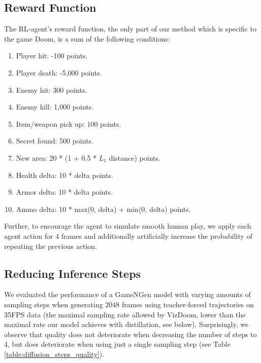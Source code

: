 \documentclass{article} %
\begin{document}
\subsection{Reward Function}
\label{appendix:reward}

The RL-agent's reward function, the only part of our method which is specific to the game Doom, is a sum of the following conditions:

\begin{enumerate}
    \item Player hit: -100 points.
    \item Player death: -5,000 points.
    \item Enemy hit: 300 points.
    \item Enemy kill: 1,000 points.
    \item Item/weapon pick up: 100 points.
    \item Secret found: 500 points.
    \item New area: 20 * (1 + 0.5 * $L_1$ distance) points.
    \item Health delta: 10 * delta points.
    \item Armor delta: 10 * delta points.
    \item Ammo delta: 10 * max(0, delta) + min(0, delta) points.
\end{enumerate}

Further, to encourage the agent to simulate smooth human play, we apply each agent action for 4 frames and additionally artificially increase the probability of repeating the previous action.

\subsection{Reducing Inference Steps}
\label{appendix:distillation}
We evaluated the performance of a GameNGen model with varying amounts of sampling steps when generating 2048 frames using teacher-forced trajectories on 35FPS data (the maximal sampling rate allowed by VizDoom, lower than the maximal rate our model achieves with distillation, see below). Surprisingly, we observe that quality does not deteriorate when decreasing the number of steps to 4, but does deteriorate when using just a single sampling step (see Table \ref{table:diffusion_steps_quality}).
\end{document}
